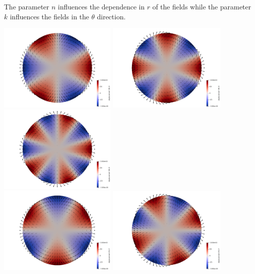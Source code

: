 The parameter $n$ influences the dependence in $r$ of the fields 
while the parameter $k$ influences the fields in the $\theta$ direction.

\newpage

\begin{center}
\includegraphics[width=5.7cm]{python_codes/fieldstone_111/results/u_k2}
\includegraphics[width=5.7cm]{python_codes/fieldstone_111/results/u_k3}
\includegraphics[width=5.7cm]{python_codes/fieldstone_111/results/u_k4}\\
\includegraphics[width=5.7cm]{python_codes/fieldstone_111/results/v_k2}
\includegraphics[width=5.7cm]{python_codes/fieldstone_111/results/v_k3}

\end{center}
